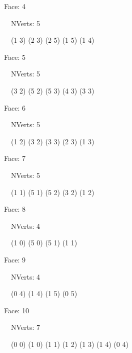 \documentclass{article}
\begin{document}
    {\footnotesize

    Face: 4

    \   \    NVerts: 5

     \   \   (1 3) (2 3) (2 5) (1 5) (1 4)}

    {\footnotesize

    Face: 5

    \   \    NVerts: 5

     \   \   (3 2) (5 2) (5 3) (4 3) (3 3)}

    {\footnotesize

    Face: 6

    \   \    NVerts: 5

     \   \   (1 2) (3 2) (3 3) (2 3) (1 3)}

    {\footnotesize

    Face: 7

    \   \    NVerts: 5

     \   \   (1 1) (5 1) (5 2) (3 2) (1 2)}

    {\footnotesize

    Face: 8

    \   \    NVerts: 4

     \   \   (1 0) (5 0) (5 1) (1 1)}

    {\footnotesize

    Face: 9

    \   \    NVerts: 4

     \   \   (0 4) (1 4) (1 5) (0 5)}

    {\footnotesize

    Face: 10

    \   \    NVerts: 7

     \   \   (0 0) (1 0) (1 1) (1 2) (1 3) (1 4) (0 4)}


     \newpage
\end{document}
